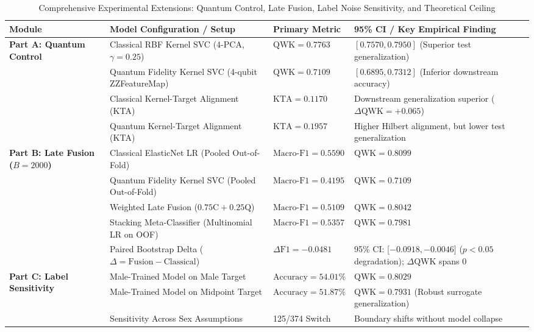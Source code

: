 \documentclass[10pt,conference]{IEEEtran}
\begin{document}
\begin{table}[t]
\centering
\caption{Comprehensive Experimental Extensions: Quantum Control, Late Fusion, Label Noise Sensitivity, and Theoretical Ceiling}
\label{tab:extensions_benchmark}
\renewcommand{\arraystretch}{0.90}
\footnotesize
\begin{tabularx}{\textwidth}{p{3.2cm}p{4.5cm}p{2.2cm}X}
\toprule
\textbf{Module} & \textbf{Model Configuration / Setup} & \textbf{Primary Metric} & \textbf{95\% CI / Key Empirical Finding} \\
\midrule
\multirow{4}{*}{\textbf{Part A: Quantum Control}} 
& Classical RBF Kernel SVC (4-PCA, $\gamma = 0.25$) & $\text{QWK} = \mathbf{0.7763}$ & $[0.7570, 0.7950]$ (Superior test generalization) \\
& Quantum Fidelity Kernel SVC (4-qubit ZZFeatureMap) & $\text{QWK} = 0.7109$ & $[0.6895, 0.7312]$ (Inferior downstream accuracy) \\
& Classical Kernel-Target Alignment (KTA) & $\text{KTA} = 0.1170$ & Downstream generalization superior ($\Delta\text{QWK} = +0.065$) \\
& Quantum Kernel-Target Alignment (KTA) & $\text{KTA} = \mathbf{0.1957}$ & Higher Hilbert alignment, but lower test generalization \\
\midrule
\multirow{5}{*}{\textbf{Part B: Late Fusion ($B = 2000$)}} 
& Classical ElasticNet LR (Pooled Out-of-Fold) & $\text{Macro-F1} = \mathbf{0.5590}$ & $\text{QWK} = \mathbf{0.8099}$ \\
& Quantum Fidelity Kernel SVC (Pooled Out-of-Fold) & $\text{Macro-F1} = 0.4195$ & $\text{QWK} = 0.7109$ \\
& Weighted Late Fusion ($0.75\text{C} + 0.25\text{Q}$) & $\text{Macro-F1} = 0.5109$ & $\text{QWK} = 0.8042$ \\
& Stacking Meta-Classifier (Multinomial LR on OOF) & $\text{Macro-F1} = 0.5357$ & $\text{QWK} = 0.7981$ \\
& Paired Bootstrap Delta ($\Delta = \text{Fusion} - \text{Classical}$) & $\Delta\text{F1} = -0.0481$ & 95\% CI: [$-0.0918, -0.0046$] ($p < 0.05$ degradation); $\Delta\text{QWK}$ spans 0 \\
\midrule
\multirow{4}{*}{\textbf{Part C: Label Sensitivity}} 
& Male-Trained Model on Male Target & $\text{Accuracy} = 54.01\%$ & $\text{QWK} = 0.8029$ \\
& Male-Trained Model on Midpoint Target & $\text{Accuracy} = 51.87\%$ & $\text{QWK} = \mathbf{0.7931}$ (Robust surrogate generalization) \\
& Sensitivity Across Sex Assumptions & 125/374 Switch & Boundary shifts without model collapse \\

\end{tabularx}
\end{table}
\end{document}
